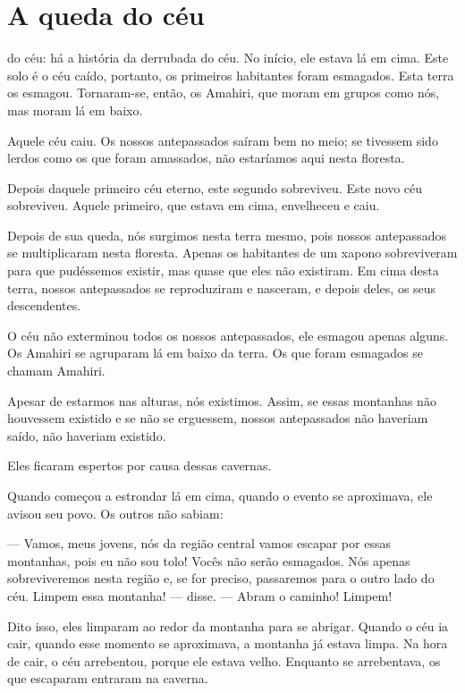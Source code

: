 \chapter{A queda do céu}

 do céu: há a história da derrubada do céu. No início, ele
estava lá em cima. Este solo é o céu caído, portanto, os primeiros
habitantes foram esmagados. Esta terra os esmagou. Tornaram-se, então,
os Amahiri, que moram em grupos como nós, mas moram lá em baixo. 

Aquele céu caiu. Os nossos antepassados saíram bem no meio; se tivessem
sido lerdos como os que foram amassados, não estaríamos aqui nesta
floresta. 

Depois daquele primeiro céu eterno, este segundo sobreviveu. Este novo
céu sobreviveu. Aquele primeiro, que estava em cima, envelheceu e caiu. 

Depois de sua queda, nós surgimos nesta terra mesmo, pois nossos
antepassados se multiplicaram nesta floresta. Apenas os habitantes de um
xapono sobreviveram para que pudéssemos existir, mas quase que eles não
existiram. Em cima desta terra, nossos antepassados se reproduziram e
nasceram, e depois deles, os seus descendentes. 

O céu não exterminou todos os nossos antepassados, ele esmagou apenas alguns. Os
Amahiri se agruparam lá em baixo da terra. Os que foram esmagados se
chamam Amahiri. 

Apesar de estarmos nas alturas, nós existimos. Assim, se essas montanhas
não houvessem existido e se não se erguessem, nossos antepassados não
haveriam saído, não haveriam existido. 

Eles ficaram espertos por causa dessas cavernas.

Quando começou a estrondar lá em cima, quando o evento se
aproximava, ele avisou seu povo. Os outros não sabiam:

--- Vamos, meus jovens, nós da região central vamos escapar por essas
montanhas, pois eu não sou tolo! Vocês não serão esmagados. Nós apenas
sobreviveremos nesta região e, se for preciso, passaremos para o outro lado
do céu. Limpem essa montanha! --- disse. --- Abram o caminho! Limpem! 

Dito isso, eles limparam ao redor da montanha para se abrigar. Quando o
céu ia cair, quando esse momento se aproximava, a montanha já estava
limpa. Na hora de cair, o céu arrebentou, porque ele estava velho.
Enquanto se arrebentava, os que escaparam entraram na caverna. 

